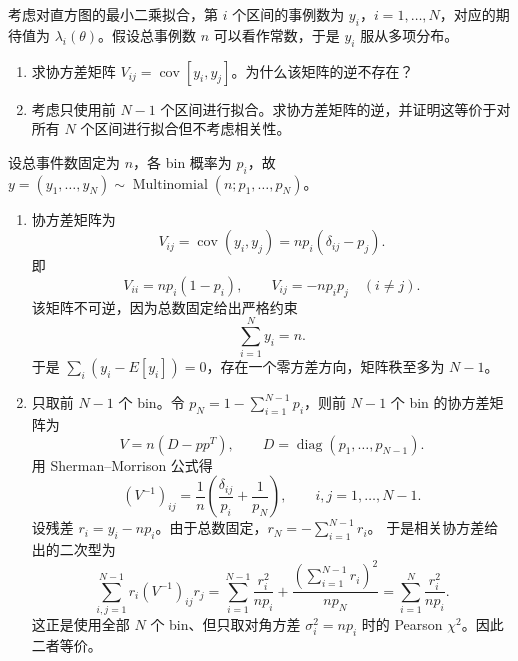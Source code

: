 \begin{question}
考虑对直方图的最小二乘拟合，第 \(i\) 个区间的事例数为
\(y_i\)，\(i=1,\ldots,N\)，对应的期待值为
\(\lambda_i(\theta)\)。假设总事例数 \(n\) 可以看作常数，于是 \(y_i\)
服从多项分布。

\begin{enumerate}
\item
  求协方差矩阵
  \(V_{ij}=\operatorname{cov}[y_i,y_j]\)。为什么该矩阵的逆不存在？
\item
  考虑只使用前 \(N-1\)
  个区间进行拟合。求协方差矩阵的逆，并证明这等价于对所有 \(N\)
  个区间进行拟合但不考虑相关性。
\end{enumerate}
\begin{solution}
设总事件数固定为 \(n\)，各 bin 概率为 \(p_i\)，故
\(y=(y_1,\ldots,y_N)\sim\operatorname{Multinomial}(n;p_1,\ldots,p_N)\)。

\begin{enumerate}
\item 协方差矩阵为
\[
V_{ij}=\operatorname{cov}(y_i,y_j)
=n p_i(\delta_{ij}-p_j).
\]
即
\[
V_{ii}=np_i(1-p_i),
\qquad
V_{ij}=-np_ip_j\quad(i\ne j).
\]
该矩阵不可逆，因为总数固定给出严格约束
\[
\sum_{i=1}^N y_i=n.
\]
于是 \(\sum_i (y_i-E[y_i])=0\)，存在一个零方差方向，矩阵秩至多为
\(N-1\)。

\item 只取前 \(N-1\) 个 bin。令 \(p_N=1-\sum_{i=1}^{N-1}p_i\)，则前
\(N-1\) 个 bin 的协方差矩阵为
\[
V=n(D-pp^T),
\qquad
D=\operatorname{diag}(p_1,\ldots,p_{N-1}).
\]
用 Sherman--Morrison 公式得
\[
(V^{-1})_{ij}=\frac1n\left(\frac{\delta_{ij}}{p_i}+\frac1{p_N}\right),
\qquad i,j=1,\ldots,N-1.
\]
设残差 \(r_i=y_i-np_i\)。由于总数固定，\(r_N=-\sum_{i=1}^{N-1}r_i\)。
于是相关协方差给出的二次型为
\[
\sum_{i,j=1}^{N-1}r_i(V^{-1})_{ij}r_j
=\sum_{i=1}^{N-1}\frac{r_i^2}{np_i}
+\frac{(\sum_{i=1}^{N-1}r_i)^2}{np_N}
=\sum_{i=1}^N\frac{r_i^2}{np_i}.
\]
这正是使用全部 \(N\) 个 bin、但只取对角方差
\(\sigma_i^2=np_i\) 时的 Pearson \(\chi^2\)。因此二者等价。
\end{enumerate}
\end{solution}
\end{question}




